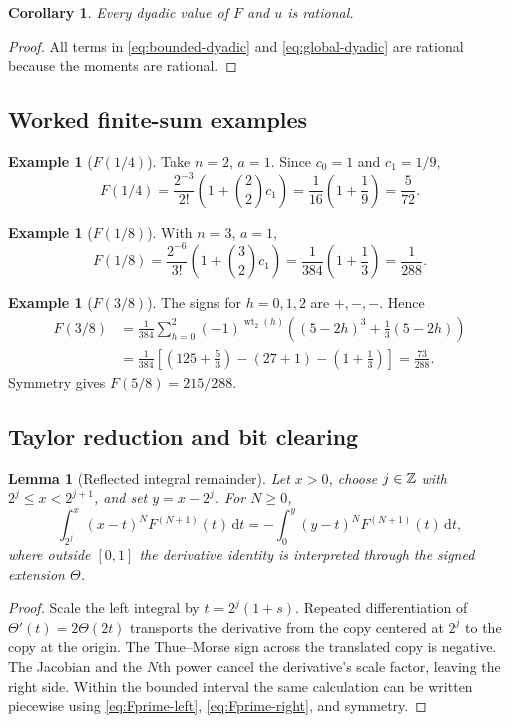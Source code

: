\documentclass[11pt]{article}
\newtheorem{lemma}[theorem]{Lemma}
\newtheorem{corollary}[theorem]{Corollary}
\theoremstyle{definition}
\newtheorem{example}[theorem]{Example}
\theoremstyle{remark}
\newcommand{\wt}{\operatorname{wt}_2}\newcommand{\upfun}{\operatorname{up}}
\newcommand{\dd}{\,\mathrm d}\newcommand{\e}{\mathrm e}\newcommand{\ii}{\mathrm i}
\begin{document}
\begin{corollary}\label{cor:dyadic-rational}
Every dyadic value of $F$ and $u$ is rational.
\end{corollary}
\begin{proof}
All terms in \eqref{eq:bounded-dyadic} and \eqref{eq:global-dyadic} are rational because the moments are rational.
\end{proof}

\subsection{Worked finite-sum examples}
\begin{example}[$F(1/4)$]
Take $n=2$, $a=1$.  Since $c_0=1$ and $c_1=1/9$,
\[
 F(1/4)=\frac{2^{-3}}{2!}
 \left(1+\binom22c_1\right)
 =\frac1{16}\left(1+\frac19\right)=\frac5{72}.
\]
\end{example}

\begin{example}[$F(1/8)$]
With $n=3$, $a=1$,
\[
 F(1/8)=\frac{2^{-6}}{3!}
 \left(1+\binom32c_1\right)
 =\frac1{384}\left(1+\frac13\right)=\frac1{288}.
\]
\end{example}

\begin{example}[$F(3/8)$]
The signs for $h=0,1,2$ are $+,-,-$.  Hence
\begin{align*}
 F(3/8)
 &=\frac1{384}\sum_{h=0}^{2}(-1)^{\wt(h)}
 \left((5-2h)^3+\frac13(5-2h)\right)\\
 &=\frac1{384}\left[\left(125+\frac53\right)
 -(27+1)-\left(1+\frac13\right)\right]
 =\frac{73}{288}.
\end{align*}
Symmetry gives $F(5/8)=215/288$.
\end{example}

\subsection{Taylor reduction and bit clearing}
\begin{lemma}[Reflected integral remainder]\label{lem:reflected-remainder}
Let $x>0$, choose $j\in\mathbb Z$ with $2^j\le x<2^{j+1}$, and set $y=x-2^j$.  For $N\ge0$,
\begin{equation}\label{eq:reflected-remainder}
 \int_{2^j}^{x}(x-t)^NF^{(N+1)}(t)\dd t
 =-\int_0^y(y-t)^NF^{(N+1)}(t)\dd t,
\end{equation}
where outside $[0,1]$ the derivative identity is interpreted through the signed extension $\Theta$.
\end{lemma}
\begin{proof}
Scale the left integral by $t=2^j(1+s)$.  Repeated differentiation of $\Theta'(t)=2\Theta(2t)$ transports the derivative from the copy centered at $2^j$ to the copy at the origin.  The Thue--Morse sign across the translated copy is negative.  The Jacobian and the $N$th power cancel the derivative's scale factor, leaving the right side.  Within the bounded interval the same calculation can be written piecewise using \eqref{eq:Fprime-left}, \eqref{eq:Fprime-right}, and symmetry.
\end{proof}
\end{document}
